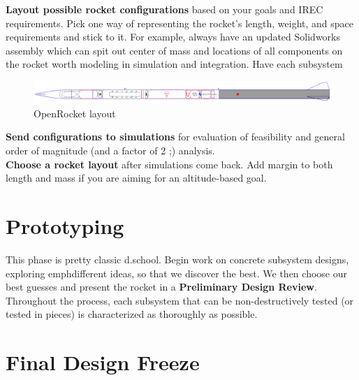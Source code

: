 \textbf{Layout possible rocket configurations} based on your goals and IREC requirements. Pick one way of representing the rocket's length, weight, and space requirements and stick to it. For example, always have an updated Solidworks assembly which can spit out center of mass and locations of all components on the rocket worth modeling in simulation and integration. Have each subsystem 

\begin{figure}[h]
\centering
\includegraphics[width = 6in]{Figures/OR_layout.PNG}
\caption{OpenRocket layout}
\end{figure}

\textbf{Send configurations to simulations} for evaluation of feasibility and general order of magnitude (and a factor of 2 ;) analysis. \\

\textbf{Choose a rocket layout} after simulations come back. Add margin to both length and mass if you are aiming for an altitude-based goal. \\ 

\section{Prototyping}
This phase is pretty classic d.school. Begin work on concrete subsystem designs, exploring emph{different} ideas, so that we discover the best. We then choose our best guesses and present the rocket in a \textbf{Preliminary Design Review}. Throughout the process, each subsystem that can be non-destructively tested (or tested in pieces) is characterized as thoroughly as possible. 
\\

\section{Final Design Freeze}